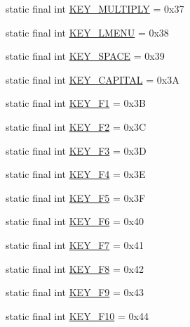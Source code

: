 \begin{DoxyCompactItemize}
static final int \mbox{\hyperlink{classorg_1_1newdawn_1_1slick_1_1_input_a45a4bb7d13e604effcf255428ff7fc2a}{K\+E\+Y\+\_\+\+M\+U\+L\+T\+I\+P\+LY}} = 0x37
\item 
static final int \mbox{\hyperlink{classorg_1_1newdawn_1_1slick_1_1_input_a6cd7bb15c3b4ad8550978adb3da6ebc1}{K\+E\+Y\+\_\+\+L\+M\+E\+NU}} = 0x38
\item 
static final int \mbox{\hyperlink{classorg_1_1newdawn_1_1slick_1_1_input_ae9b39721a7b669da9c87454285cb7c5f}{K\+E\+Y\+\_\+\+S\+P\+A\+CE}} = 0x39
\item 
static final int \mbox{\hyperlink{classorg_1_1newdawn_1_1slick_1_1_input_ad844f9bd6d820aa1b9e0f456ea1679b3}{K\+E\+Y\+\_\+\+C\+A\+P\+I\+T\+AL}} = 0x3A
\item 
static final int \mbox{\hyperlink{classorg_1_1newdawn_1_1slick_1_1_input_a8bec65a869680a778c4503a206a2ab5b}{K\+E\+Y\+\_\+\+F1}} = 0x3B
\item 
static final int \mbox{\hyperlink{classorg_1_1newdawn_1_1slick_1_1_input_ab1c49413d5f0c5f25ceb5e53645badaf}{K\+E\+Y\+\_\+\+F2}} = 0x3C
\item 
static final int \mbox{\hyperlink{classorg_1_1newdawn_1_1slick_1_1_input_ab2755b6247bb7523d1eb8529860ae5ec}{K\+E\+Y\+\_\+\+F3}} = 0x3D
\item 
static final int \mbox{\hyperlink{classorg_1_1newdawn_1_1slick_1_1_input_aeea9a75d216cc35134a11b5122f5903d}{K\+E\+Y\+\_\+\+F4}} = 0x3E
\item 
static final int \mbox{\hyperlink{classorg_1_1newdawn_1_1slick_1_1_input_a9589d42b73daaa535c6f534709c3195d}{K\+E\+Y\+\_\+\+F5}} = 0x3F
\item 
static final int \mbox{\hyperlink{classorg_1_1newdawn_1_1slick_1_1_input_a8551a4b136c4d64c49bd89370c3f8abf}{K\+E\+Y\+\_\+\+F6}} = 0x40
\item 
static final int \mbox{\hyperlink{classorg_1_1newdawn_1_1slick_1_1_input_a93a64a0c93b121592ccf4080f6db566c}{K\+E\+Y\+\_\+\+F7}} = 0x41
\item 
static final int \mbox{\hyperlink{classorg_1_1newdawn_1_1slick_1_1_input_a721b029b3a9a9fd063e113deac0de950}{K\+E\+Y\+\_\+\+F8}} = 0x42
\item 
static final int \mbox{\hyperlink{classorg_1_1newdawn_1_1slick_1_1_input_af64375a9b204d4b795fb20f897b6dae0}{K\+E\+Y\+\_\+\+F9}} = 0x43
\item 
static final int \mbox{\hyperlink{classorg_1_1newdawn_1_1slick_1_1_input_aefdc96cc95befda4deff8b7ea3ada875}{K\+E\+Y\+\_\+\+F10}} = 0x44
\item 

\end{DoxyCompactItemize}
